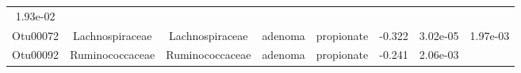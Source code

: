 \documentclass[11pt,]{article}
\begin{document}
\begin{longtable}[]{@{}cccccccc@{}}
\begin{minipage}[t]{0.08\columnwidth}
1.93e-02\strut
\end{minipage}\tabularnewline
\begin{minipage}[t]{0.08\columnwidth}\centering\strut
Otu00072\strut
\end{minipage} & \begin{minipage}[t]{0.15\columnwidth}\centering\strut
Lachnospiraceae\strut
\end{minipage} & \begin{minipage}[t]{0.15\columnwidth}\centering\strut
Lachnospiraceae\strut
\end{minipage} & \begin{minipage}[t]{0.08\columnwidth}\centering\strut
adenoma\strut
\end{minipage} & \begin{minipage}[t]{0.09\columnwidth}\centering\strut
propionate\strut
\end{minipage} & \begin{minipage}[t]{0.07\columnwidth}\centering\strut
-0.322\strut
\end{minipage} & \begin{minipage}[t]{0.08\columnwidth}\centering\strut
3.02e-05\strut
\end{minipage} & \begin{minipage}[t]{0.08\columnwidth}\centering\strut
1.97e-03\strut
\end{minipage}\tabularnewline
\begin{minipage}[t]{0.08\columnwidth}\centering\strut
Otu00092\strut
\end{minipage} & \begin{minipage}[t]{0.15\columnwidth}\centering\strut
Ruminococcaceae\strut
\end{minipage} & \begin{minipage}[t]{0.15\columnwidth}\centering\strut
Ruminococcaceae\strut
\end{minipage} & \begin{minipage}[t]{0.08\columnwidth}\centering\strut
adenoma\strut
\end{minipage} & \begin{minipage}[t]{0.09\columnwidth}\centering\strut
propionate\strut
\end{minipage} & \begin{minipage}[t]{0.07\columnwidth}\centering\strut
-0.241\strut
\end{minipage} & \begin{minipage}[t]{0.08\columnwidth}\centering\strut
2.06e-03\strut
\end{minipage} & \begin{minipage}[t]{0.08\columnwidth}\centering\strut

\end{minipage}
\end{longtable}
\end{document}
